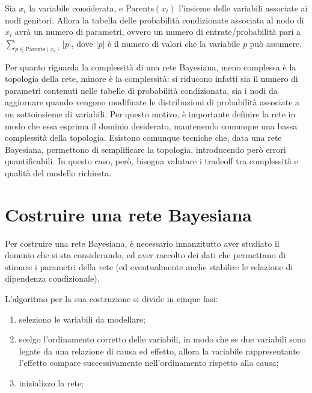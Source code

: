 Sia $x_i$ la variabile considerata, e $\text{Parents}(x_i)$ l'insieme
delle variabili associate ai nodi genitori. Allora la tabella delle
probabilità condizionate associata al nodo di $x_i$ avrà un numero
di parametri, ovvero un numero di entrate/probabilità pari a
$\sum_{p \in \text{Parents}(x_i)} |p|$, dove $|p|$ è il numero di valori
che la variabile $p$ può assumere.

Per quanto riguarda la complessità di una rete Bayesiana, meno complessa
è la topologia della rete, minore è la complessità: si riducono infatti
sia il numero di parametri contenuti nelle tabelle di probabilità
condizionata, sia i nodi da aggiornare quando vengono modificate le distribuzioni
di probabilità associate a un sottoinsieme di variabili.
Per questo motivo, è importante definire la rete in modo che essa esprima
il dominio desiderato, mantenendo comunque una bassa complessità della topologia.
Esistono comunque tecniche che, data una rete Bayesiana, permettono di
semplificare la topologia, introducendo però errori quantificabili. In questo
caso, però, bisogna valutare i tradeoff tra complessità e qualità del modello
richiesta.

\section{Costruire una rete Bayesiana}
Per costruire una rete Bayesiana, è necessario innanzitutto aver studiato
il dominio che si sta considerando, ed aver raccolto dei dati che
permettano di stimare i parametri della rete (ed eventualmente anche
stabilire le relazione di dipendenza condizionale).

L'algoritmo per la sua costruzione si divide in cinque fasi:
\begin{enumerate}
    \item seleziono le variabili da modellare;
    \item scelgo l'ordinamento corretto delle variabili, in modo che
    se due variabili sono legate da una relazione di causa ed effetto,
    allora la variabile rappresentante l'effetto compare successivamente
    nell'ordinamento rispetto alla causa;
    \item inizializzo la rete;
\end{enumerate}
